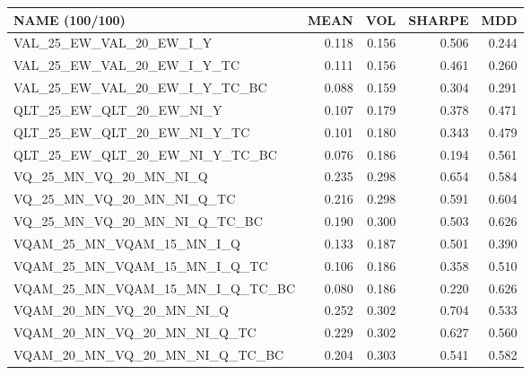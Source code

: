 \begin{tabular}{lrrrr}
\toprule
NAME (100/100) & MEAN & VOL & SHARPE & MDD \\
\midrule
VAL\_25\_EW\_VAL\_20\_EW\_I\_Y & 0.118 & 0.156 & 0.506 & 0.244 \\
VAL\_25\_EW\_VAL\_20\_EW\_I\_Y\_TC & 0.111 & 0.156 & 0.461 & 0.260 \\
VAL\_25\_EW\_VAL\_20\_EW\_I\_Y\_TC\_BC & 0.088 & 0.159 & 0.304 & 0.291 \\
QLT\_25\_EW\_QLT\_20\_EW\_NI\_Y & 0.107 & 0.179 & 0.378 & 0.471 \\
QLT\_25\_EW\_QLT\_20\_EW\_NI\_Y\_TC & 0.101 & 0.180 & 0.343 & 0.479 \\
QLT\_25\_EW\_QLT\_20\_EW\_NI\_Y\_TC\_BC & 0.076 & 0.186 & 0.194 & 0.561 \\
VQ\_25\_MN\_VQ\_20\_MN\_NI\_Q & 0.235 & 0.298 & 0.654 & 0.584 \\
VQ\_25\_MN\_VQ\_20\_MN\_NI\_Q\_TC & 0.216 & 0.298 & 0.591 & 0.604 \\
VQ\_25\_MN\_VQ\_20\_MN\_NI\_Q\_TC\_BC & 0.190 & 0.300 & 0.503 & 0.626 \\
VQAM\_25\_MN\_VQAM\_15\_MN\_I\_Q & 0.133 & 0.187 & 0.501 & 0.390 \\
VQAM\_25\_MN\_VQAM\_15\_MN\_I\_Q\_TC & 0.106 & 0.186 & 0.358 & 0.510 \\
VQAM\_25\_MN\_VQAM\_15\_MN\_I\_Q\_TC\_BC & 0.080 & 0.186 & 0.220 & 0.626 \\
VQAM\_20\_MN\_VQ\_20\_MN\_NI\_Q & 0.252 & 0.302 & 0.704 & 0.533 \\
VQAM\_20\_MN\_VQ\_20\_MN\_NI\_Q\_TC & 0.229 & 0.302 & 0.627 & 0.560 \\
VQAM\_20\_MN\_VQ\_20\_MN\_NI\_Q\_TC\_BC & 0.204 & 0.303 & 0.541 & 0.582 \\
\bottomrule
\end{tabular}
